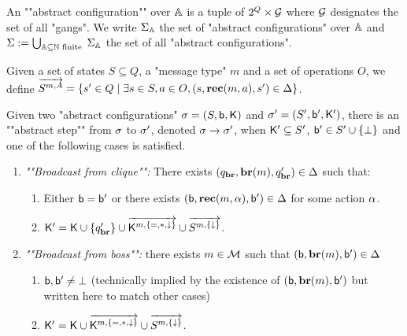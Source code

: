\begin{definition}
	\label{def:abstract-configuration}
	An ""abstract configuration"" over $\mathbb{A}$ is a tuple of $2^Q \times \mathcal{G}$ where $\mathcal{G}$ designates the set of all "gangs". We write $\Sigma_{\mathbb{A}}$ the set of "abstract configurations" over $\mathbb{A}$ and $\Sigma := \bigcup_{\mathbb{A} \subseteq \mathbb{N} \text{ finite }}\Sigma_{\mathbb{A}}$ the set of all "abstract configurations". 
	
	Given a set of states $S \subseteq Q$, a "message type" $m$ and a set of operations $O$, we define $\overrightarrow{S^{m,A}} = \{s' \in Q \mid \exists s \in S, a\in O, (s, \textbf{rec}(m, a), s') \in \Delta\}$.
	
	Given two "abstract configurations" $\sigma = (S, \mathsf{b}, \mathsf{K})$ and $\sigma' = (S', \mathsf{b}', \mathsf{K}')$, there is an ""abstract step"" from $\sigma$ to $\sigma'$, denoted $\sigma \xrightarrow{} \sigma'$, when $\mathsf{K}' \subseteq S'$, $\mathsf{b}' \in S' \cup \{\bot\}$ and one of the following cases is satisfied.
	\begin{enumerate}
		\item \emph{""Broadcast from clique"":} There exists $(q_{\textbf{br}}, \textbf{br}(m), q_{\textbf{br}}') \in \Delta$ such that:
		\begin{enumerate}[label = (\arabic*)] 
			
			\item\label{item:broadcast_from_clique_boss} Either $\mathsf{b} = \mathsf{b}'$ or there exists $(\mathsf{b}, \textbf{rec}(m, \alpha), \mathsf{b}') \in \Delta$ for some action $\alpha$.
			
			\item\label{item:broadcast_from_clique_clique}$ \mathsf{K}' = \mathsf{K} \cup \{q_{\textbf{br}}'\}\cup \overrightarrow{\mathsf{K}^{m,\{{=}, {*}, \downarrow\}}} \cup \overrightarrow{S^{m,\{\downarrow\}}}$.
		\end{enumerate}
		
		\item \emph{""Broadcast from boss"":} there exists $m \in \mathcal{M}$ such that $(\mathsf{b}, \textbf{br}(m), \mathsf{b}') \in \Delta$
		\begin{enumerate}[label = (\arabic*)]
		
			\item\label{item:broadcast_from_boss_boss} $\mathsf{b}, \mathsf{b}' \ne \bot$ (technically implied by the existence of $(\mathsf{b}, \textbf{br}(m), \mathsf{b}')$ but written here to match other cases)
			
			\item\label{item:broadcast_from_boss_clique} $\mathsf{K}'= \mathsf{K} \cup \overrightarrow{\mathsf{K}^{m,\{{=}, {*}, \downarrow\}}} \cup \overrightarrow{S^{m,\{\downarrow\}}}$.
		\end{enumerate}
		

\end{enumerate}
\end{definition}
